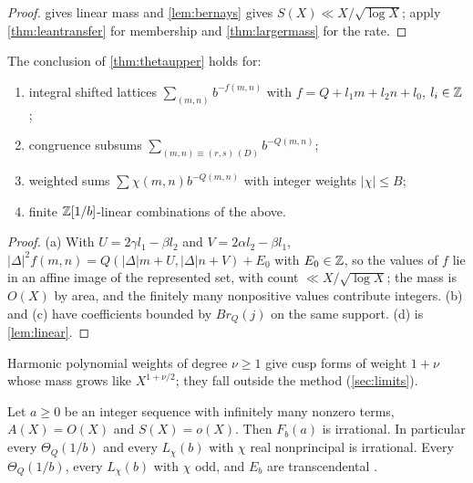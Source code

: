 \documentclass[11pt]{article}
\begin{document}
\begin{proof}
 gives linear mass and \cref{lem:bernays} gives $S(X)\ll X/\sqrt{\log X}$;
apply \cref{thm:leantransfer} for membership and \cref{thm:largermass} for the rate.
\end{proof}

\begin{proposition}[Extensions]\label{prop:extensions}
The conclusion of \cref{thm:thetaupper} holds for:
\begin{enumerate}[label=\textup{(\alph*)},nosep]
\item integral shifted lattices $\sum_{(m,n)}b^{-f(m,n)}$ with
$f=Q+l_1m+l_2n+l_0$, $l_i\in\mathbb Z$;
\item congruence subsums $\sum_{(m,n)\equiv(r,s)\,(D)}b^{-Q(m,n)}$;
\item weighted sums $\sum\chi(m,n)b^{-Q(m,n)}$ with integer weights $|\chi|\le B$;
\item finite $\mathbb Z[1/b]$-linear combinations of the above.
\end{enumerate}
\end{proposition}

\begin{proof}
(a) With $U=2\gamma l_1-\beta l_2$ and $V=2\alpha l_2-\beta l_1$,
$|\Delta|^2f(m,n)=Q(|\Delta|m+U,|\Delta|n+V)+E_0$ with $E_0\in\mathbb Z$, so the values of $f$ lie in an affine
image of the represented set, with count $\ll X/\sqrt{\log X}$; the mass is $O(X)$ by area, and the
finitely many nonpositive values contribute integers. (b) and (c) have coefficients bounded by
$Br_Q(j)$ on the same support. (d) is \cref{lem:linear}.
\end{proof}

Harmonic polynomial weights of degree $\nu\ge1$ give cusp forms of weight $1+\nu$ whose mass
grows like $X^{1+\nu/2}$; they fall outside the method (\cref{sec:limits}).

\begin{proposition}\label{prop:arith}
Let $a\ge0$ be an integer sequence with infinitely many nonzero terms, $A(X)=O(X)$ and
$S(X)=o(X)$. Then $F_b(a)$ is irrational. In particular every $\Theta_Q(1/b)$ and every
$L_\chi(b)$ with $\chi$ real nonprincipal is irrational. Every $\Theta_Q(1/b)$, every $L_\chi(b)$
with $\chi$ odd, and $E_b$ are transcendental
\cite{Nesterenko1996,DNNS1996,Bertrand1997,HamiehMurty2016}.
\end{proposition}
\end{document}
